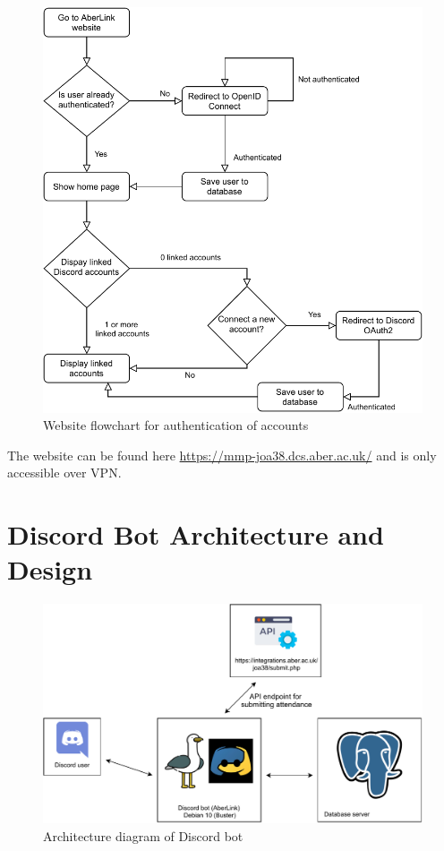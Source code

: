 \begin{figure}[H]
	\centering
	\includegraphics[width=0.8\linewidth]{Figures/website-flowchart}
	\caption{Website flowchart for authentication of accounts}
	\label{fig:architecture-web-flow}
\end{figure}

The website can be found here \href{https://mmp-joa38.dcs.aber.ac.uk/}{https://mmp-joa38.dcs.aber.ac.uk/} and is only accessible over VPN.

\section{Discord Bot Architecture and Design}
\begin{figure}[H]
	\centering
	\includegraphics[width=0.9\linewidth]{Figures/Architecture-discord}
	\caption{Architecture diagram of Discord bot}
	\label{fig:architecture-dis}
\end{figure}

